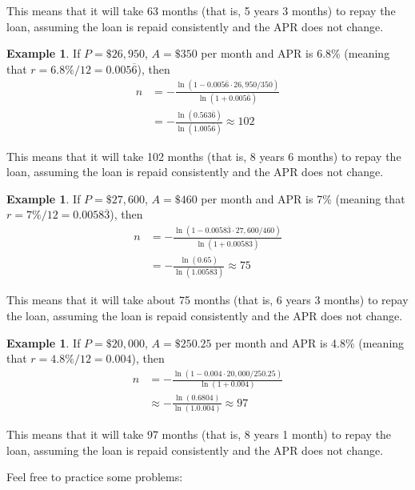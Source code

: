 \documentclass[12pt,letterpaper]{amsart}
\theoremstyle{definition} %
\newtheorem{example}[theorem]{Example}
\begin{document}
\par This means that it will take 63 months (that is, 5 years 3 months) to repay the loan, assuming the loan is repaid consistently and the APR does not change.

\vfill
\pagebreak

\begin{example}If $P=\$26,950$, $A=\$350$ per month and APR is 6.8\% (meaning that $r=6.8\%/12=0.005\overline{6}$), then
\begin{align*}n&=-\frac{\ln{(1-0.005\overline{6}\cdot 26,950/350)}}{\ln{(1+0.005\overline{6})}}\\
&=-\frac{\ln{(0.563\overline{6})}}{\ln{(1.005\overline{6})}}\approx 102\end{align*}
\par This means that it will take 102 months (that is, 8 years 6 months) to repay the loan, assuming the loan is repaid consistently and the APR does not change.\end{example}

\begin{example}If $P=\$27,600$, $A=\$460$ per month and APR is 7\% (meaning that $r=7\%/12=0.0058\overline{3}$), then
\begin{align*}n&=-\frac{\ln{(1-0.0058\overline{3}\cdot 27,600/460)}}{\ln{(1+0.0058\overline{3})}}\\
&=-\frac{\ln{(0.65)}}{\ln{(1.0058\overline{3})}}\approx 75\end{align*}
\par This means that it will take about 75 months (that is, 6 years 3 months) to repay the loan, assuming the loan is repaid consistently and the APR does not change.\end{example}

\begin{example}If $P=\$20,000$, $A=\$250.25$ per month and APR is 4.8\% (meaning that $r=4.8\%/12=0.004$), then
\begin{align*}n&=-\frac{\ln{(1-0.004\cdot 20,000/250.25)}}{\ln{(1+0.004)}}\\
&\approx-\frac{\ln{(0.6804)}}{\ln{(1.0.004)}}\approx 97\end{align*}
\par This means that it will take 97 months (that is, 8 years 1 month) to repay the loan, assuming the loan is repaid consistently and the APR does not change.\end{example}

\vfill
\pagebreak

\par Feel free to practice some problems:
\end{document}
